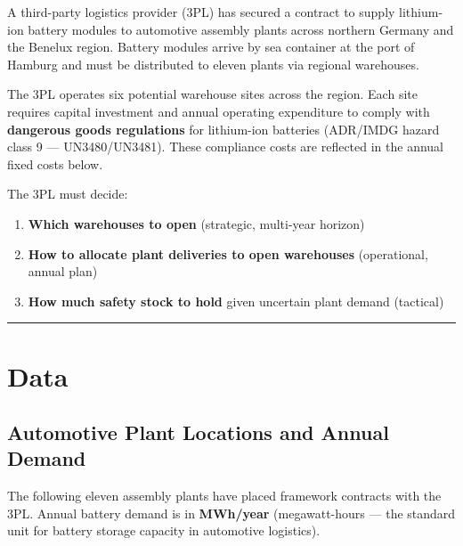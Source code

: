 \documentclass[
  a4paper,
]{article}
\providecommand{\tightlist}{%
  \setlength{\itemsep}{0pt}\setlength{\parskip}{0pt}}
\begin{document}
A third-party logistics provider (3PL) has secured a contract to supply
lithium-ion battery modules to automotive assembly plants across
northern Germany and the Benelux region. Battery modules arrive by sea
container at the port of Hamburg and must be distributed to eleven
plants via regional warehouses.

The 3PL operates six potential warehouse sites across the region. Each
site requires capital investment and annual operating expenditure to
comply with \textbf{dangerous goods regulations} for lithium-ion
batteries (ADR/IMDG hazard class 9 --- UN3480/UN3481). These compliance
costs are reflected in the annual fixed costs below.

The 3PL must decide:

\begin{enumerate}
\def\labelenumi{\arabic{enumi}.}
\tightlist
\item
  \textbf{Which warehouses to open} (strategic, multi-year horizon)
\item
  \textbf{How to allocate plant deliveries to open warehouses}
  (operational, annual plan)
\item
  \textbf{How much safety stock to hold} given uncertain plant demand
  (tactical)
\end{enumerate}

\begin{center}\rule{0.5\linewidth}{0.5pt}\end{center}

\section{Data}\label{data}

\subsection{Automotive Plant Locations and Annual
Demand}\label{automotive-plant-locations-and-annual-demand}

The following eleven assembly plants have placed framework contracts
with the 3PL. Annual battery demand is in \textbf{MWh/year}
(megawatt-hours --- the standard unit for battery storage capacity in
automotive logistics).
\end{document}
